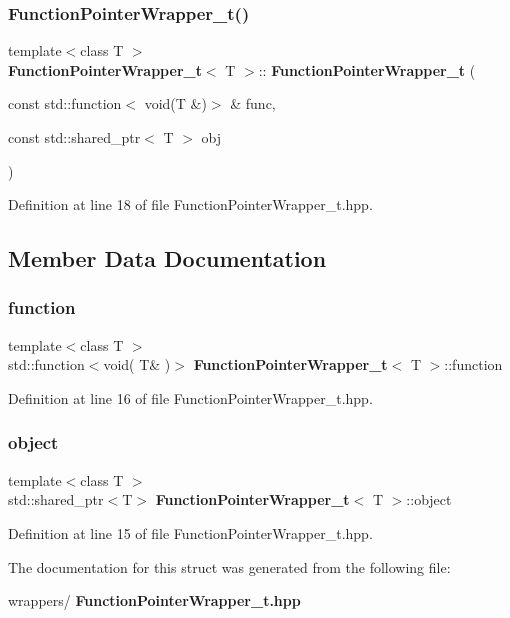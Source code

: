 \subsubsection{Function\+Pointer\+Wrapper\+\_\+t()}
{\footnotesize\ttfamily template$<$class T $>$ \\
\textbf{ Function\+Pointer\+Wrapper\+\_\+t}$<$ T $>$\+::\textbf{ Function\+Pointer\+Wrapper\+\_\+t} (\begin{DoxyParamCaption}\item[{const std\+::function$<$ void(T \&)$>$ \&}]{func,  }\item[{const std\+::shared\+\_\+ptr$<$ T $>$}]{obj }\end{DoxyParamCaption})\hspace{0.3cm}{\ttfamily [inline]}}



Definition at line 18 of file Function\+Pointer\+Wrapper\+\_\+t.\+hpp.



\subsection{Member Data Documentation}
\mbox{\label{struct_function_pointer_wrapper__t_a80fef3fe437029b6316f6aa4edae5b49}} 
\subsubsection{function}
{\footnotesize\ttfamily template$<$class T $>$ \\
std\+::function$<$void( T\& )$>$ \textbf{ Function\+Pointer\+Wrapper\+\_\+t}$<$ T $>$\+::function}



Definition at line 16 of file Function\+Pointer\+Wrapper\+\_\+t.\+hpp.

\mbox{\label{struct_function_pointer_wrapper__t_a6eb0757f8336cf880388a841c72f00ff}} 
\subsubsection{object}
{\footnotesize\ttfamily template$<$class T $>$ \\
std\+::shared\+\_\+ptr$<$T$>$ \textbf{ Function\+Pointer\+Wrapper\+\_\+t}$<$ T $>$\+::object}



Definition at line 15 of file Function\+Pointer\+Wrapper\+\_\+t.\+hpp.



The documentation for this struct was generated from the following file\+:\begin{DoxyCompactItemize}
\item 
wrappers/\textbf{ Function\+Pointer\+Wrapper\+\_\+t.\+hpp}\end{DoxyCompactItemize}
